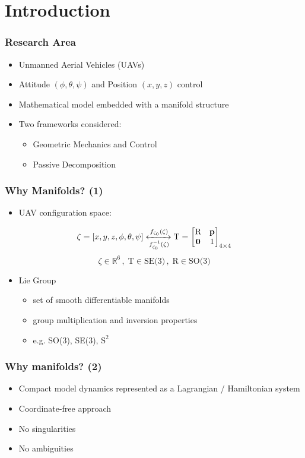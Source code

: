 
\section{Introduction}

\begin{frame}
	\frametitle{Research Area}
	
	\begin{itemize}
		\item Unmanned Aerial Vehicles (UAVs)
		\item Attitude $(\phi, \theta, \psi)$ and Position $(x, y, z)$ control
		\item Mathematical model embedded with a manifold structure
		\item Two frameworks considered:
		
		\begin{itemize}
			\item Geometric Mechanics and Control
			\item Passive Decomposition
		\end{itemize}
	\end{itemize}
\end{frame}

\begin{frame}
	\frametitle{Why Manifolds? (1)}
	
	\begin{itemize}
		\item UAV configuration space:
	\end{itemize}
	\begin{equation}
		\zeta = [x, y, z, \phi, \theta, \psi] 
		\xleftrightarrow[f_{\zeta_0}^{-1}(\zeta)]{f_{\zeta_0}(\zeta)}
		\text{T} = \begin{bmatrix}
		\text{R} & \textbf{p} \\
		\textbf{0} & 1
		\end{bmatrix}_{4\times 4} 
	\end{equation}
	\begin{equation}
		\zeta \in \mathbb{R}^6  \, , \; \text{T} \in \text{SE(3)} \, , \; \text{R} \in \text{SO(3)}
	\end{equation}
	
	\begin{itemize}
		\item Lie Group
		\begin{itemize}
			\item set of smooth differentiable manifolds
			\item group multiplication and inversion properties
			\item e.g. SO(3), SE(3), $\text{S}^2$
		\end{itemize}
	\end{itemize}
\end{frame}

\begin{frame}
	\frametitle{Why manifolds? (2)}
	
	\begin{itemize}
		\item Compact model dynamics represented as a Lagrangian / Hamiltonian system
		\item Coordinate-free approach
		\item No singularities
		\item No ambiguities
	\end{itemize}
\end{frame}